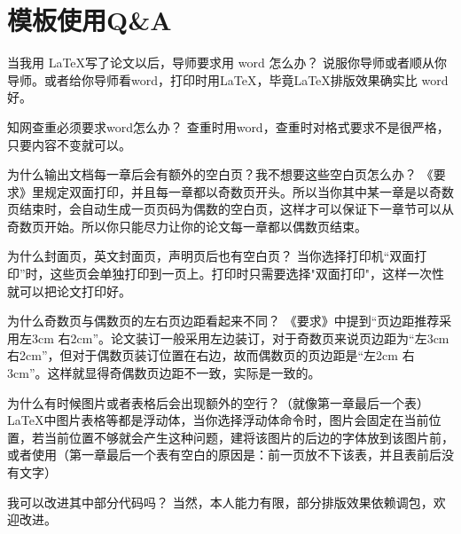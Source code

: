 \linespread{1.55}\selectfont
\chapter{模板使用Q\&A}
\begin{mybox}{当我用 \LaTeX 写了论文以后，导师要求用 word 怎么办？}
说服你导师或者顺从你导师。或者给你导师看word，打印时用\LaTeX，毕竟\LaTeX 排版效果确实比 word 好。
\end{mybox}
\begin{mybox}{知网查重必须要求word怎么办？}
查重时用word，查重时对格式要求不是很严格，只要内容不变就可以。
\end{mybox}

\begin{mybox}{为什么输出文档每一章后会有额外的空白页？我不想要这些空白页怎么办？}
《要求》里规定双面打印，并且{\color{red}每一章都以奇数页开头}。所以当你其中某一章是以奇数页结束时，会自动生成一页页码为偶数的空白页，这样才可以保证下一章节可以从奇数页开始。所以你只能尽力让你的论文每一章都以偶数页结束。
\end{mybox}

\begin{mybox}{为什么封面页，英文封面页，声明页后也有空白页？}
当你选择打印机“双面打印”时，这些页会单独打印到一页上。打印时只需要选择"双面打印"，这样一次性就可以把论文打印好。
\end{mybox}

\begin{mybox}{为什么奇数页与偶数页的左右页边距看起来不同？}
《要求》中提到“页边距推荐采用左3cm 右2cm”。论文装订一般采用左边装订，对于奇数页来说页边距为“左3cm 右2cm”，但对于偶数页装订位置在右边，故而偶数页的页边距是“左2cm 右3cm”。这样就显得奇偶数页边距不一致，实际是一致的。
\end{mybox}

\begin{mybox}{为什么有时候图片或者表格后会出现额外的空行？（就像第一章最后一个表）}
\LaTeX 中图片表格等都是浮动体，当你选择浮动体\myverb{[H]}命令时，图片会固定在当前位置，若当前位置不够就会产生这种问题，建将该图片的后边的字体放到该图片前，或者使用（第一章最后一个表有空白的原因是：前一页放不下该表，并且表前后没有文字）
\end{mybox}

\begin{mybox}{我可以改进其中部分代码吗？}
当然，本人能力有限，部分排版效果依赖调包，欢迎改进。
\end{mybox}